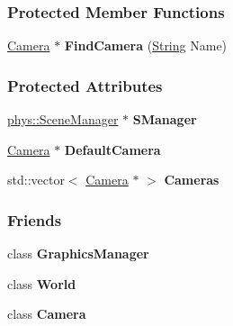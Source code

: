 \subsubsection*{Protected Member Functions}
\begin{DoxyCompactItemize}
\item 
\hypertarget{classphys_1_1CameraManager_a17eb1f44fff4fe4af8683cedba0c9fbf}{
\hyperlink{classphys_1_1Camera}{Camera} $\ast$ {\bfseries FindCamera} (\hyperlink{namespacephys_aa03900411993de7fbfec4789bc1d392e}{String} Name)}
\label{d9/d91/classphys_1_1CameraManager_a17eb1f44fff4fe4af8683cedba0c9fbf}

\end{DoxyCompactItemize}
\subsubsection*{Protected Attributes}
\begin{DoxyCompactItemize}
\item 
\hypertarget{classphys_1_1CameraManager_a8e89645398c7d334e99280cfa721d864}{
\hyperlink{classphys_1_1SceneManager}{phys::SceneManager} $\ast$ {\bfseries SManager}}
\label{d9/d91/classphys_1_1CameraManager_a8e89645398c7d334e99280cfa721d864}

\item 
\hypertarget{classphys_1_1CameraManager_a1f8aa3d003e6cfed9eee3527118518fb}{
\hyperlink{classphys_1_1Camera}{Camera} $\ast$ {\bfseries DefaultCamera}}
\label{d9/d91/classphys_1_1CameraManager_a1f8aa3d003e6cfed9eee3527118518fb}

\item 
\hypertarget{classphys_1_1CameraManager_a49af26478b62e2246ca1abd19abeec6c}{
std::vector$<$ \hyperlink{classphys_1_1Camera}{Camera} $\ast$ $>$ {\bfseries Cameras}}
\label{d9/d91/classphys_1_1CameraManager_a49af26478b62e2246ca1abd19abeec6c}

\end{DoxyCompactItemize}
\subsubsection*{Friends}
\begin{DoxyCompactItemize}
\item 
\hypertarget{classphys_1_1CameraManager_ad65eae853be6e1a35bf85e6865583560}{
class {\bfseries GraphicsManager}}
\label{d9/d91/classphys_1_1CameraManager_ad65eae853be6e1a35bf85e6865583560}

\item 
\hypertarget{classphys_1_1CameraManager_a7b4bcdf992c21ae83363f25df05b1d25}{
class {\bfseries World}}
\label{d9/d91/classphys_1_1CameraManager_a7b4bcdf992c21ae83363f25df05b1d25}

\item 
\hypertarget{classphys_1_1CameraManager_ad8bd9afbbd7af19d996da80e9d25890d}{
class {\bfseries Camera}}
\label{d9/d91/classphys_1_1CameraManager_ad8bd9afbbd7af19d996da80e9d25890d}

\end{DoxyCompactItemize}


